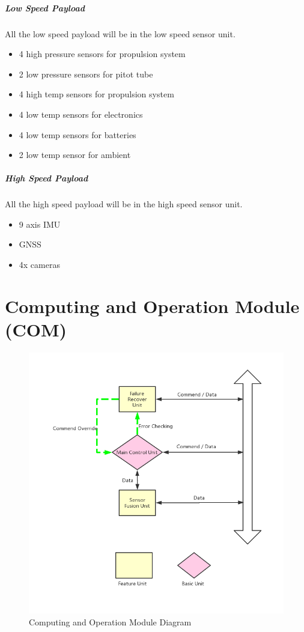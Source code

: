 \documentclass[12pt,article]{memoir}
\begin{document}
\subparagraph{Low Speed Payload}
All the low speed payload will be in the low speed sensor unit.
\begin{itemize}
\item 4 high pressure sensors for propulsion system
\item 2 low pressure sensors for pitot tube
\item 4 high temp sensors for propulsion system
\item 4 low temp sensors for electronics
\item 4 low temp sensors for batteries
\item 2 low temp sensor for ambient
\end{itemize}

\subparagraph{High Speed Payload}
All the high speed payload will be in the high speed sensor unit.
\begin{itemize}
\item 9 axis IMU
\item GNSS
\item 4x cameras
\end{itemize}

\clearpage
\section{Computing and Operation Module (COM)}
\begin{figure}[htp]
\includegraphics[width=\textwidth]{img/ES00003_COMdia.png}
 \caption{Computing and Operation Module Diagram}	
\end{figure}
\end{document}
